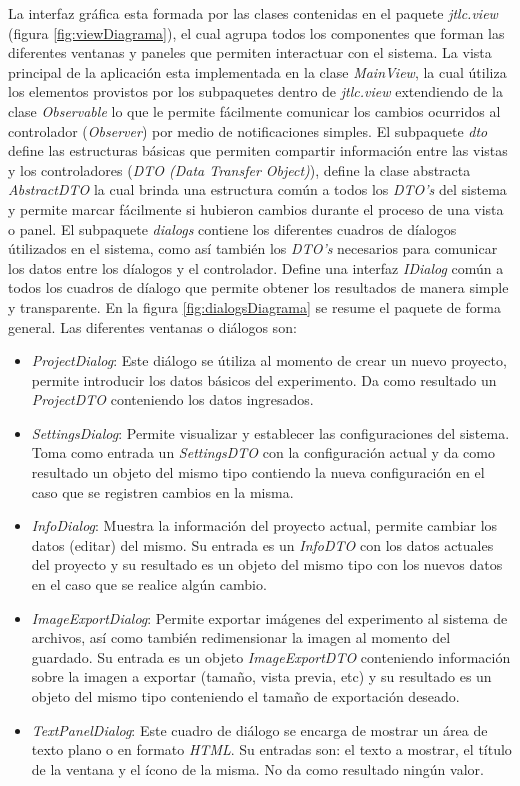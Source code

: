 \newpage
La interfaz gr\'afica esta formada por las clases contenidas en el paquete \textit{jtlc.view} (figura \ref{fig:viewDiagrama}), el cual agrupa todos los componentes que forman las diferentes ventanas y paneles que permiten interactuar con el sistema. La vista principal de la aplicaci\'on esta implementada en la clase \textit{MainView}, la cual \'utiliza los elementos provistos por los subpaquetes dentro de \textit{jtlc.view} extendiendo de la clase \textit{Observable} lo que le permite f\'acilmente comunicar los cambios ocurridos al controlador (\textit{Observer}) por medio de notificaciones simples. El subpaquete \textit{dto} define las estructuras b\'asicas que permiten compartir informaci\'on entre las vistas y los controladores (\textit{DTO (Data Transfer Object)}), define la clase abstracta \textit{AbstractDTO} la cual brinda una estructura com\'un a todos los \textit{DTO's} del sistema y permite marcar f\'acilmente si hubieron cambios durante el proceso de una vista o panel.
El subpaquete \textit{dialogs} contiene los diferentes cuadros de d\'ialogos \'utilizados en el sistema, como as\'i tambi\'en los \textit{DTO's} necesarios para comunicar los datos entre los d\'ialogos y el controlador. Define una interfaz \textit{IDialog} com\'un a todos los cuadros de d\'ialogo que permite obtener los resultados de manera simple y transparente. En la figura \ref{fig:dialogsDiagrama} se resume el paquete de forma general. Las diferentes ventanas o di\'alogos son:
\begin{itemize}
	\item \textit{ProjectDialog}: Este di\'alogo se \'utiliza al momento de crear un nuevo proyecto, permite introducir los datos b\'asicos del experimento. Da como resultado un \textit{ProjectDTO} conteniendo los datos ingresados.
	\item \textit{SettingsDialog}: Permite visualizar y establecer las configuraciones del sistema. Toma como entrada un \textit{SettingsDTO} con la configuraci\'on actual y da como resultado un objeto del mismo tipo contiendo la nueva configuraci\'on en el caso que se registren cambios en la misma.
	\item \textit{InfoDialog}: Muestra la informaci\'on del proyecto actual, permite cambiar los datos (editar) del mismo. Su entrada es un \textit{InfoDTO} con los datos actuales del proyecto y su resultado es un objeto del mismo tipo con los nuevos datos en el caso que se realice alg\'un cambio.
	\item \textit{ImageExportDialog}: Permite exportar im\'agenes del experimento al sistema de archivos, as\'i como tambi\'en redimensionar la imagen al momento del guardado. Su entrada es un objeto \textit{ImageExportDTO} conteniendo informaci\'on sobre la imagen a exportar (tama\~no, vista previa, etc) y su resultado es un objeto del mismo tipo conteniendo el tama\~no de exportaci\'on deseado.
	\item \textit{TextPanelDialog}: Este cuadro de di\'alogo se encarga de mostrar un \'area de texto plano o en formato \textit{HTML}. Su entradas son: el texto a mostrar, el t\'itulo de la ventana y el \'icono de la misma. No da como resultado ning\'un valor.
\end{itemize}

